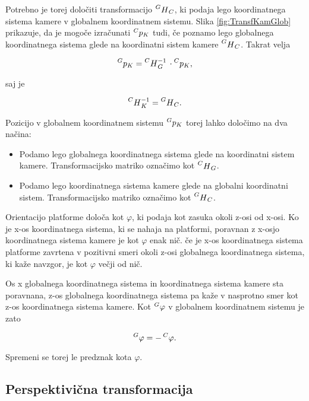 Potrebno je torej določiti transformacijo $\prescript{G}{}H_C$, ki podaja lego koordinatnega sistema kamere v globalnem koordinatnem sistemu. Slika \ref{fig:TransfKamGlob} prikazuje, da je mogoče izračunati $\prescript{C}{}p_K$ tudi, če poznamo lego globalnega koordinatnega sistema glede na koordinatni sistem kamere $\prescript{G}{}H_C$. Takrat velja

\begin{equation}
    \prescript{G}{}p_K = \prescript{C}{}H_G^{-1} \, \cdot \prescript{C}{}p_K,
\end{equation}

saj je

\begin{equation}
\prescript{C}{}H_K^{-1} = \prescript{G}{}H_C.
\end{equation}

Pozicijo v globalnem koordinatnem sistemu $\prescript{G}{}p_K$ torej lahko določimo na dva načina:

\begin{itemize}
\item Podamo lego globalnega koordinatnega sistema glede na koordinatni sistem kamere. Transformacijsko matriko označimo kot $\prescript{C}{}H_G$.
\item Podamo lego koordinatnega sistema kamere glede na globalni koordinatni sistem. Transformacijsko matriko označimo kot $\prescript{G}{}H_C$.
\end{itemize}

Orientacijo platforme določa kot $\varphi$, ki podaja kot zasuka okoli z-osi od x-osi. Ko je x-os koordinatnega sistema, ki se nahaja na platformi, poravnan z x-osjo koordinatnega sistema kamere je kot $\varphi$ enak nič. če je x-os koordinatnega sistema platforme zavrtena v pozitivni smeri okoli z-osi globalnega koordinatnega sistema, ki kaže navzgor, je kot $\varphi$ večji od nič.

Os x globalnega koordinatnega sistema in koordinatnega sistema kamere sta poravnana, z-os globalnega koordinatnega sistema pa kaže v nasprotno smer kot z-os koordinatnega sistema kamere. Kot $\prescript{G}{}\varphi$ v globalnem koordinatnem sistemu je zato

\begin{equation}
    \prescript{G}{}\varphi = - \prescript{C}{}\varphi.
\end{equation}

Spremeni se torej le predznak kota $\varphi$.


\subsection{Perspektivična transformacija}

